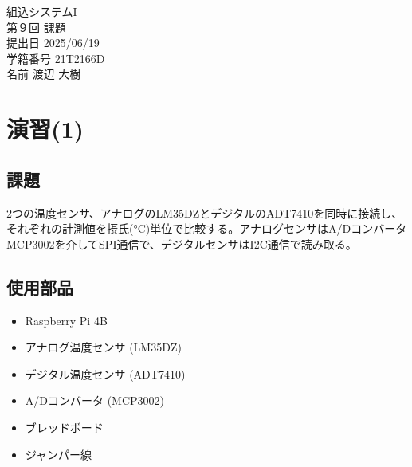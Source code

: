 \documentclass[a4paper,11pt,dvipdfmx]{jsarticle}
\begin{document}

\begin{titlepage}
\noindent
\vspace{4cm}
\begin{center}
\begin{LARGE}
組込システムI \\
第９回  課題 \\
\vspace{8cm}
提出日  2025/06/19 \\
学籍番号  21T2166D \\
名前  渡辺 大樹 \\
\end{LARGE}
\end{center}
\end{titlepage}
\setcounter{page}{1}

\section{演習(1)}
\subsection{課題}
2つの温度センサ、アナログのLM35DZとデジタルのADT7410を同時に接続し、それぞれの計測値を摂氏(°C)単位で比較する。アナログセンサはA/DコンバータMCP3002を介してSPI通信で、デジタルセンサはI2C通信で読み取る。

\subsection{使用部品}
\begin{itemize}
    \item Raspberry Pi 4B
    \item アナログ温度センサ (LM35DZ)
    \item デジタル温度センサ (ADT7410)
    \item A/Dコンバータ (MCP3002)
    \item ブレッドボード
    \item ジャンパー線
\end{itemize}
\end{document}
